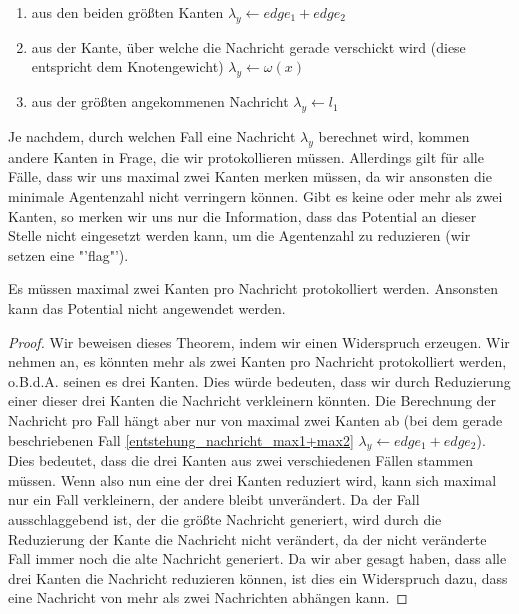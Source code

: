 \begin{enumerate}[label=\alph*)]
	
	\item aus den beiden größten Kanten $\lambda_{y} \gets edge_{1} + edge_{2}$ \label{entstehung_nachricht_max1+max2}
	
	\item aus der Kante, über welche die Nachricht gerade verschickt wird (diese entspricht dem Knotengewicht) $\lambda_{y} \gets \omega(x)$
	
	\item aus der größten angekommenen Nachricht $\lambda_{y} \gets l_{1}$

\end{enumerate}

Je nachdem, durch welchen Fall eine Nachricht $\lambda_{y}$ berechnet wird, kommen andere Kanten in Frage, die wir protokollieren müssen.
Allerdings gilt für alle Fälle, dass wir uns maximal zwei Kanten merken müssen, da wir ansonsten die minimale Agentenzahl nicht verringern können. Gibt es keine oder mehr als zwei Kanten, so merken wir uns nur die Information, dass das Potential an dieser Stelle nicht eingesetzt werden kann, um die Agentenzahl zu reduzieren (wir setzen eine "'flag"').

\begin{theorem}\label{theorem_max2kanten}
	Es müssen maximal zwei Kanten pro Nachricht protokolliert werden. Ansonsten kann das Potential nicht angewendet werden.
\end{theorem}

\begin{proof}
	Wir beweisen dieses Theorem, indem wir einen Widerspruch erzeugen. Wir nehmen an, es könnten mehr als zwei Kanten pro Nachricht protokolliert werden, o.B.d.A. seinen es drei Kanten. Dies würde bedeuten, dass wir durch Reduzierung einer dieser drei Kanten die Nachricht verkleinern könnten. Die Berechnung der Nachricht pro Fall hängt aber nur von maximal zwei Kanten ab (bei dem gerade beschriebenen Fall \ref{entstehung_nachricht_max1+max2} $\lambda_{y} \gets edge_{1} + edge_{2}$). Dies bedeutet, dass die drei Kanten aus zwei verschiedenen Fällen stammen müssen. Wenn also nun eine der drei Kanten reduziert wird, kann sich maximal nur ein Fall verkleinern, der andere bleibt unverändert. Da der Fall ausschlaggebend ist, der die größte Nachricht generiert, wird durch die Reduzierung der Kante die Nachricht nicht verändert, da der nicht veränderte Fall immer noch die alte Nachricht generiert. Da wir aber gesagt haben, dass alle drei Kanten die Nachricht reduzieren können, ist dies ein Widerspruch dazu, dass eine Nachricht von mehr als zwei Nachrichten abhängen kann.
\end{proof}

